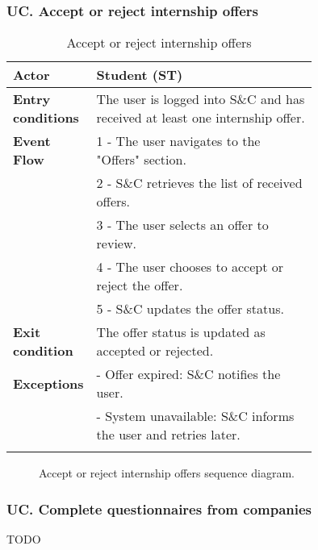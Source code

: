 \subsubsection*{UC\cuc . Accept or reject internship offers}
\begin{center}
    \begin{longtable}{|l|p{0.75\linewidth}|}
        \hline
        \textbf{Actor}            & Student (ST) \\
        \hline
        \textbf{Entry conditions} & The user is logged into S\&C and has received at least one internship offer. \\
        \hline
        \textbf{Event Flow}       & 1 - The user navigates to the "Offers" section. \\
        & 2 - S\&C retrieves the list of received offers. \\
        & 3 - The user selects an offer to review. \\
        & 4 - The user chooses to accept or reject the offer. \\
        & 5 - S\&C updates the offer status. \\
        \hline
        \textbf{Exit condition}   & The offer status is updated as accepted or rejected. \\       
        \hline
        \textbf{Exceptions}       & - Offer expired: S\&C notifies the user. \\
                                  & - System unavailable: S\&C informs the user and retries later. \\
        \hline
        \caption{Accept or reject internship offers}
        \label{tab:accept_reject_offers_usecase}
    \end{longtable}
\end{center}

\begin{figure}[H]
    \begin{center}
        
        \caption{Accept or reject internship offers sequence diagram.}
        \label{fig:accept_reject_offers_seqd}%
    \end{center}
\end{figure}

\subsubsection*{UC\cuc . Complete questionnaires from companies}
TODO

